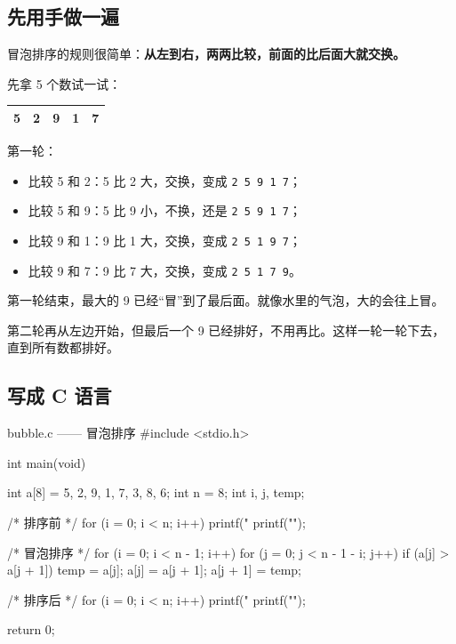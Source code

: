 \subsection{先用手做一遍}

冒泡排序的规则很简单：\textbf{从左到右，两两比较，前面的比后面大就交换。}

先拿 5 个数试一试：

\begin{center}
\begin{tabular}{@{}ccccc@{}}
\toprule
5 & 2 & 9 & 1 & 7 \\
\bottomrule
\end{tabular}
\end{center}

第一轮：

\begin{itemize}
  \item 比较 5 和 2：5 比 2 大，交换，变成 \texttt{2 5 9 1 7}；
  \item 比较 5 和 9：5 比 9 小，不换，还是 \texttt{2 5 9 1 7}；
  \item 比较 9 和 1：9 比 1 大，交换，变成 \texttt{2 5 1 9 7}；
  \item 比较 9 和 7：9 比 7 大，交换，变成 \texttt{2 5 1 7 9}。
\end{itemize}

第一轮结束，最大的 9 已经“冒”到了最后面。就像水里的气泡，大的会往上冒。

第二轮再从左边开始，但最后一个 9 已经排好，不用再比。这样一轮一轮下去，直到所有数都排好。

\subsection{写成 C 语言}

\begin{codebox}{bubble.c —— 冒泡排序}
#include <stdio.h>

int main(void)
{
    int a[8] = {5, 2, 9, 1, 7, 3, 8, 6};
    int n = 8;
    int i, j, temp;

    /* 排序前 */
    for (i = 0; i < n; i++) {
        printf("%
    }
    printf("\n");

    /* 冒泡排序 */
    for (i = 0; i < n - 1; i++) {
        for (j = 0; j < n - 1 - i; j++) {
            if (a[j] > a[j + 1]) {
                temp = a[j];
                a[j] = a[j + 1];
                a[j + 1] = temp;
            }
        }
    }

    /* 排序后 */
    for (i = 0; i < n; i++) {
        printf("%
    }
    printf("\n");

    return 0;
}
\end{codebox}

